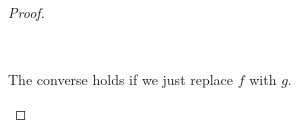 \documentclass[11pt]{article}
\newenvironment{myproof}
{\begin{proof} \begin{adjustwidth}{3em}{0pt}$ $\par\nobreak\ignorespaces}
{\end{adjustwidth} \end{proof}}
\begin{document}
\begin{flushleft}
\begin{myproof}
The converse holds if we                                                                                                                                                                                                                                                                                                                                                                                                                                                                                                                                                                                                                                                                                                                                                                                                                                                                                                                                                                                                                                                                                                                                                                                                                                                                                                                                                                                                                                                                                                                                                                                                                                                                                                                                                                                                                                                                                                                                                                                                                                                                                                                                                                                                                                                                                                                                                                                                                                                                                                                                                                                                                                                                                                    just replace $f$ with $g$.


\end{myproof}
\end{flushleft}
\end{document}
